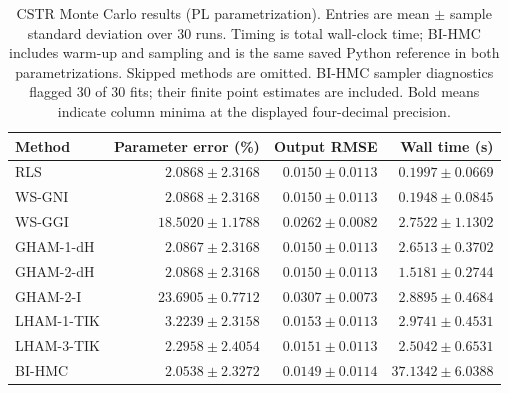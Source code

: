 \begin{table}[tbp]
\centering
\small
\setlength{\tabcolsep}{4pt}
\caption{CSTR Monte Carlo results (PL parametrization). Entries are mean $\pm$ sample standard deviation over 30 runs. Timing is total wall-clock time; BI-HMC includes warm-up and sampling and is the same saved Python reference in both parametrizations. Skipped methods are omitted. BI-HMC sampler diagnostics flagged 30 of 30 fits; their finite point estimates are included. Bold means indicate column minima at the displayed four-decimal precision.}
\label{tab:cstr-montecarlo-pl}
\begin{tabular}{lrrr}
\toprule
Method & Parameter error (\%) & Output RMSE & Wall time (s) \\
\midrule
RLS & $2.0868 \pm 2.3168$ & $0.0150 \pm 0.0113$ & $0.1997 \pm 0.0669$ \\
WS-GNI & $2.0868 \pm 2.3168$ & $0.0150 \pm 0.0113$ & $\mathbf{0.1948} \pm 0.0845$ \\
WS-GGI & $18.5020 \pm 1.1788$ & $0.0262 \pm 0.0082$ & $2.7522 \pm 1.1302$ \\
GHAM-1-dH & $2.0867 \pm 2.3168$ & $0.0150 \pm 0.0113$ & $2.6513 \pm 0.3702$ \\
GHAM-2-dH & $2.0868 \pm 2.3168$ & $0.0150 \pm 0.0113$ & $1.5181 \pm 0.2744$ \\
GHAM-2-I & $23.6905 \pm 0.7712$ & $0.0307 \pm 0.0073$ & $2.8895 \pm 0.4684$ \\
LHAM-1-TIK & $3.2239 \pm 2.3158$ & $0.0153 \pm 0.0113$ & $2.9741 \pm 0.4531$ \\
LHAM-3-TIK & $2.2958 \pm 2.4054$ & $0.0151 \pm 0.0113$ & $2.5042 \pm 0.6531$ \\
BI-HMC & $\mathbf{2.0538} \pm 2.3272$ & $\mathbf{0.0149} \pm 0.0114$ & $37.1342 \pm 6.0388$ \\
\bottomrule
\end{tabular}
\end{table}

